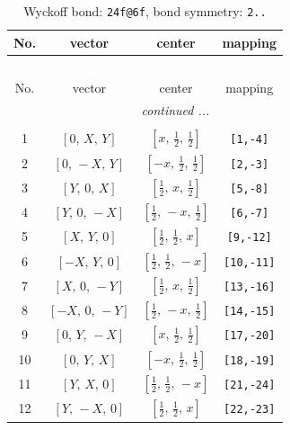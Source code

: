 \documentclass[fleqn,8pt]{jsarticle}
\begin{document}
\begin{longtable}{cccc}
\caption{Wyckoff bond: {\tt 24f@6f}, bond symmetry: {\tt 2..}}
 \\
 \hline \hline
No. & vector & center & mapping \\ \hline \endfirsthead

\multicolumn{3}{l}{\tablename\ \thetable{}} \\
 \hline \hline
No. & vector & center & mapping \\ \hline \endhead

 \hline \hline
\multicolumn{3}{r}{\footnotesize\it continued ...} \\ \endfoot

 \hline \hline
\multicolumn{3}{r}{} \\ \endlastfoot

1 & $\left[ 0,\, X,\, Y \right]$ & $\left[ x,\, \frac{1}{2},\, \frac{1}{2} \right]$ & {\tt [1,-4]} \\ \hline
2 & $\left[ 0,\, - X,\, Y \right]$ & $\left[ - x,\, \frac{1}{2},\, \frac{1}{2} \right]$ & {\tt [2,-3]} \\ \hline
3 & $\left[ Y,\, 0,\, X \right]$ & $\left[ \frac{1}{2},\, x,\, \frac{1}{2} \right]$ & {\tt [5,-8]} \\ \hline
4 & $\left[ Y,\, 0,\, - X \right]$ & $\left[ \frac{1}{2},\, - x,\, \frac{1}{2} \right]$ & {\tt [6,-7]} \\ \hline
5 & $\left[ X,\, Y,\, 0 \right]$ & $\left[ \frac{1}{2},\, \frac{1}{2},\, x \right]$ & {\tt [9,-12]} \\ \hline
6 & $\left[ - X,\, Y,\, 0 \right]$ & $\left[ \frac{1}{2},\, \frac{1}{2},\, - x \right]$ & {\tt [10,-11]} \\ \hline
7 & $\left[ X,\, 0,\, - Y \right]$ & $\left[ \frac{1}{2},\, x,\, \frac{1}{2} \right]$ & {\tt [13,-16]} \\ \hline
8 & $\left[ - X,\, 0,\, - Y \right]$ & $\left[ \frac{1}{2},\, - x,\, \frac{1}{2} \right]$ & {\tt [14,-15]} \\ \hline
9 & $\left[ 0,\, Y,\, - X \right]$ & $\left[ x,\, \frac{1}{2},\, \frac{1}{2} \right]$ & {\tt [17,-20]} \\ \hline
10 & $\left[ 0,\, Y,\, X \right]$ & $\left[ - x,\, \frac{1}{2},\, \frac{1}{2} \right]$ & {\tt [18,-19]} \\ \hline
11 & $\left[ Y,\, X,\, 0 \right]$ & $\left[ \frac{1}{2},\, \frac{1}{2},\, - x \right]$ & {\tt [21,-24]} \\ \hline
12 & $\left[ Y,\, - X,\, 0 \right]$ & $\left[ \frac{1}{2},\, \frac{1}{2},\, x \right]$ & {\tt [22,-23]} \\ \hline

\end{longtable}
\end{document}
